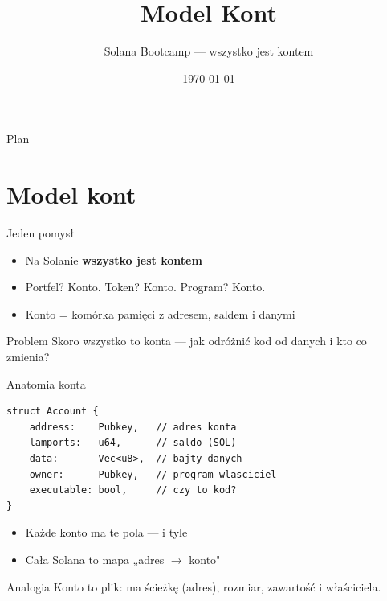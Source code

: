 

\usepackage[utf8]{inputenc}
\usepackage[T1]{fontenc}

\title{Model Kont}
\subtitle{Solana Bootcamp --- wszystko jest kontem}
\author{}
\date{\today}



\maketitleframe

\begin{frame}{Plan}
  \tableofcontents
\end{frame}

\section{Model kont}

\begin{frame}{Jeden pomysł}
  \begin{itemize}
    \item Na Solanie \textbf{wszystko jest kontem}
    \item Portfel? Konto. Token? Konto. Program? Konto.
    \item Konto = komórka pamięci z adresem, saldem i danymi
  \end{itemize}
  \vspace{0.25cm}
  \begin{alertblock}{Problem}
    Skoro wszystko to konta --- jak odróżnić kod od danych i kto co zmienia?
  \end{alertblock}
\end{frame}

\begin{frame}[fragile]{Anatomia konta}
\begin{lstlisting}
struct Account {
    address:    Pubkey,   // adres konta
    lamports:   u64,      // saldo (SOL)
    data:       Vec<u8>,  // bajty danych
    owner:      Pubkey,   // program-wlasciciel
    executable: bool,     // czy to kod?
}
\end{lstlisting}
  \begin{itemize}
    \item Każde konto ma te pola --- i tyle
    \item Cała Solana to mapa „adres $\to$ konto"
  \end{itemize}
  \begin{exampleblock}{Analogia}
    Konto to plik: ma ścieżkę (adres), rozmiar, zawartość i właściciela.
  \end{exampleblock}
\end{frame}

